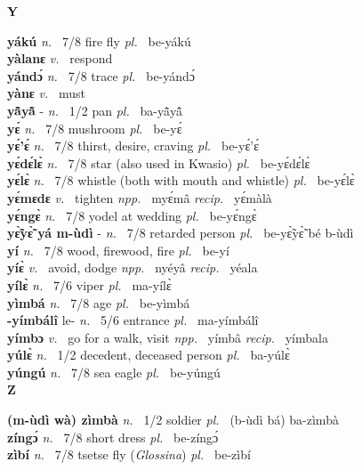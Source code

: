 \medskip
\noindent \large {\bfseries Y}\normalsize\\
\medskip

\noindent
{\bfseries yákú}  {\itshape n.~} 7/8 fire fly {\itshape pl.~} be-yákú    \\ 
{\bfseries yàlanɛ}  {\itshape v.~} respond    \\ 
{\bfseries yándɔ́}  {\itshape n.~} 7/8 trace {\itshape pl.~} be-yándɔ́    \\ 
{\bfseries yànɛ}  {\itshape v.~} must    \\ 
{\bfseries yã̂yã̂} - {\itshape n.~} 1/2 pan {\itshape pl.~} ba-yã̂yã̂    \\ 
{\bfseries yɛ́}  {\itshape n.~} 7/8 mushroom  {\itshape pl.~} be-yɛ́    \\ 
{\bfseries yɛ́'ɛ́}  {\itshape n.~} 7/8 thirst, desire, craving {\itshape pl.~} be-yɛ́'ɛ́    \\ 
{\bfseries yɛ́dɛ́lɛ̀}  {\itshape n.~} 7/8 star (also used in Kwasio) {\itshape pl.~} be-yɛ́dɛ́lɛ̀    \\ 
{\bfseries yɛ́lɛ̀}  {\itshape n.~} 7/8 whistle (both with mouth and whistle) {\itshape pl.~} be-yɛ́lɛ̀    \\ 
{\bfseries yɛ́mɛdɛ}  {\itshape v.~} tighten   {\itshape npp.~} myɛ́mâ {\itshape recip.~} yɛ́màlà  \\ 
{\bfseries yɛ́ngɛ̀}  {\itshape n.~} 7/8 yodel at wedding {\itshape pl.~} be-yɛ́ngɛ̀    \\ 
{\bfseries yɛ̃̀yɛ̃̀ yá m-ùdì} - {\itshape n.~} 7/8 retarded person {\itshape pl.~} be-yɛ̃̀yɛ̃̀ bé b-ùdì    \\ 
{\bfseries yí}  {\itshape n.~} 7/8 wood, firewood, fire {\itshape pl.~} be-yí    \\ 
{\bfseries yíɛ̀}  {\itshape v.~} avoid, dodge   {\itshape npp.~} nyéyâ {\itshape recip.~} yéala  \\ 
{\bfseries yílɛ̀}  {\itshape n.~} 7/6 viper {\itshape pl.~} ma-yílɛ̀    \\ 
{\bfseries yìmbá}  {\itshape n.~} 7/8 age {\itshape pl.~} be-yìmbá    \\ 
{\bfseries -yímbálî} le- {\itshape n.~} 5/6 entrance {\itshape pl.~} ma-yímbálî    \\ 
{\bfseries yímbɔ}  {\itshape v.~} go for a walk, visit   {\itshape npp.~} yímbâ {\itshape recip.~} yímbala  \\ 
{\bfseries yúlɛ̀}  {\itshape n.~} 1/2 decedent, deceased person {\itshape pl.~} ba-yúlɛ̀    \\ 
{\bfseries  yúngú}  {\itshape n.~} 7/8 sea eagle {\itshape pl.~} be-yúngú    \\ 


\medskip
\noindent \large {\bfseries Z}\normalsize\\
\medskip

\noindent
{\bfseries (m-ùdì wà) zìmbà} {\itshape n.~} 1/2 soldier {\itshape pl.~} (b-ùdì bá) ba-zìmbà    \\ 
{\bfseries zíngɔ́}  {\itshape n.~} 7/8 short dress {\itshape pl.~} be-zíngɔ́    \\ 
{\bfseries zìbí}  {\itshape n.~} 7/8 tsetse fly ({\itshape Glossina}) {\itshape pl.~} be-zìbí    \\ 

\onecolumn

%
